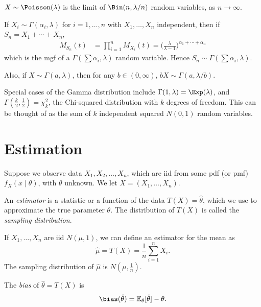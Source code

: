 \documentclass[12pt]{article}
\begin{document}
$X \sim \Poisson(\lambda)$ is the limit of $\Bin(n, \lambda/n)$ random variables, as $n \to \infty$.

If $X_i \sim \Gamma(\alpha_i,\lambda)$ for $i = 1, \ldots, n$ with $X_1, \ldots, X_n$ independent, then if $S_n = X_1 + \cdots + X_n$,
\begin{align*}
	M_{S_n}(t) &= \prod_{i = 1}^{n} M_{X_i}(t) = \biggl( \frac{\lambda}{\lambda - 1} \biggr)^{\alpha_1 + \cdots + \alpha_n}
\end{align*}
which is the mgf of a $\Gamma(\sum \alpha_i, \lambda)$ random variable. Hence $S_n \sim \Gamma(\sum \alpha_i, \lambda)$.

Also, if $X \sim \Gamma(a, \lambda)$, then for any $b \in (0, \infty)$, $bX \sim \Gamma(a, \lambda/b)$.

Special cases of the Gamma distribution include $\Gamma(1, \lambda) = \Exp(\lambda)$, and $\Gamma(\frac{k}{2}, \frac{1}{2}) = \chi_k^2$, the Chi-squared distribution with $k$ degrees of freedom. This can be thought of as the sum of $k$ independent squared $N(0,1)$ random variables.

\newpage

\section{Estimation}
\label{sec:estimation}

Suppose we observe data $X_1, X_2, \ldots, X_n$, which are iid from some pdf (or pmf) $f_X(x \mid \theta)$, with $\theta$ unknown. We let $X = (X_1, \ldots, X_n)$.

\begin{definition}
	An \emph{estimator} is a statistic or a function of the data $T(X) = \hat \theta$, which we use to approximate the true parameter $\theta$. The distribution of $T(X)$ is called the \emph{sampling distribution}.
\end{definition}

\begin{exbox}
	If $X_1, \ldots, X_n$ are iid $N(\mu, 1)$, we can define an estimator for the mean as
	\[
	\hat \mu = T(X) = \frac{1}{n} \sum_{i = 1}^{n}X_i
	.\]
	The sampling distribution of $\hat \mu$ is $N(\mu, \frac{1}{n})$.
\end{exbox}

\begin{definition}
	The \emph{bias} of $\hat \theta = T(X)$ is
	\[
	\bias(\hat \theta) = \mathbb{E}_\theta[\hat \theta] - \theta
	.\]
\end{definition}
\end{document}
